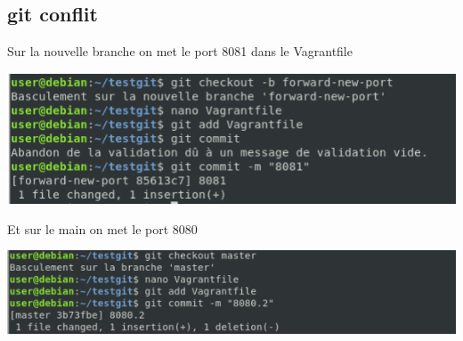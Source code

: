 \documentclass{article}
\begin{document}
 
 
 
 \subsection{\large{git conflit}}
 
 Sur la nouvelle branche on met le port 8081 dans le Vagrantfile
 
 \begin{center}
        \includegraphics[scale=0.5]{Images/8081.png}
 \end{center}
 
 Et sur le main on met le port 8080
 
 \begin{center}
        \includegraphics[scale=0.5]{Images/8080.png}
 \end{center}
 
\end{document}
